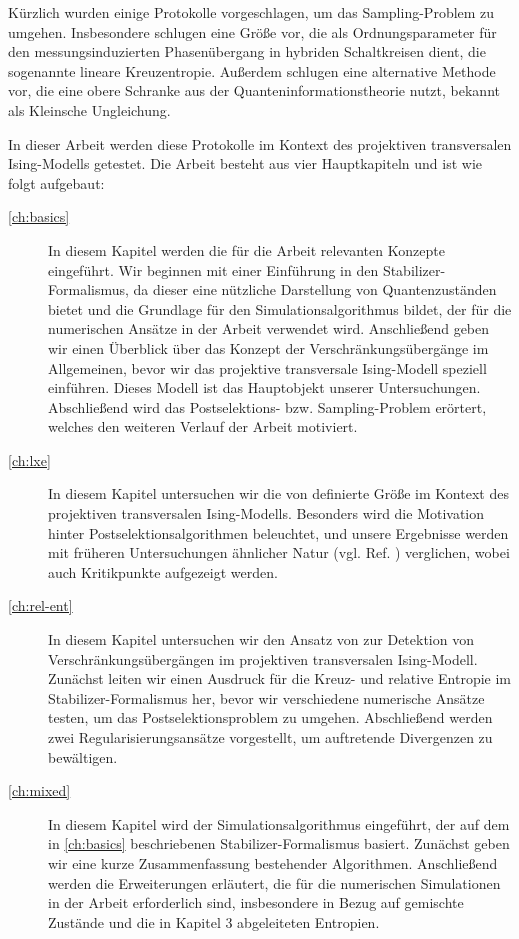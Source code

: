 Kürzlich wurden einige Protokolle vorgeschlagen, um das Sampling-Problem zu
umgehen. Insbesondere schlugen \citeauthor{liCrossEntropyBenchmark2023} eine
Größe vor, die als Ordnungsparameter für den messungsinduzierten Phasenübergang
in hybriden Schaltkreisen dient, die sogenannte lineare Kreuzentropie. Außerdem
schlugen \citeauthor{garrattProbingPostmeasurementEntanglement2023} eine
alternative Methode vor, die eine obere Schranke aus der
Quanteninformationstheorie nutzt, bekannt als Kleinsche Ungleichung.

In dieser Arbeit werden diese Protokolle im Kontext des projektiven
transversalen Ising-Modells getestet. Die Arbeit besteht aus vier Hauptkapiteln
und ist wie folgt aufgebaut:
\begin{description}
\item[\cref{ch:basics}] In diesem Kapitel werden die für die Arbeit relevanten
  Konzepte eingeführt. Wir beginnen mit einer Einführung in den
  Stabilizer-Formalismus, da dieser eine nützliche Darstellung von
  Quantenzuständen bietet und die Grundlage für den Simulationsalgorithmus
  bildet, der für die numerischen Ansätze in der Arbeit verwendet wird.
  Anschließend geben wir einen Überblick über das Konzept der
  Verschränkungsübergänge im Allgemeinen, bevor wir das projektive transversale
  Ising-Modell speziell einführen. Dieses Modell ist das Hauptobjekt unserer
  Untersuchungen. Abschließend wird das Postselektions- bzw. Sampling-Problem
  erörtert, welches den weiteren Verlauf der Arbeit motiviert.
\item[\cref{ch:lxe}] In diesem Kapitel untersuchen wir die von
  \citeauthor{liCrossEntropyBenchmark2023} definierte Größe im Kontext des
  projektiven transversalen Ising-Modells. Besonders wird die Motivation hinter
  Postselektionsalgorithmen beleuchtet, und unsere Ergebnisse werden mit
  früheren Untersuchungen ähnlicher Natur (vgl. Ref.
  \cite{tikhanovskayaUniversalityCrossEntropy2023}) verglichen, wobei auch
  Kritikpunkte aufgezeigt werden.
\item[\cref{ch:rel-ent}] In diesem Kapitel untersuchen wir den Ansatz von
  \citeauthor{garrattProbingPostmeasurementEntanglement2023} zur Detektion von
  Verschränkungsübergängen im projektiven transversalen Ising-Modell. Zunächst
  leiten wir einen Ausdruck für die Kreuz- und relative Entropie im
  Stabilizer-Formalismus her, bevor wir verschiedene numerische Ansätze testen,
  um das Postselektionsproblem zu umgehen. Abschließend werden zwei
  Regularisierungsansätze vorgestellt, um auftretende Divergenzen zu
  bewältigen.
\item[\cref{ch:mixed}] In diesem Kapitel wird der Simulationsalgorithmus
  eingeführt, der auf dem in \cref{ch:basics} beschriebenen
  Stabilizer-Formalismus basiert. Zunächst geben wir eine kurze Zusammenfassung
  bestehender Algorithmen. Anschließend werden die Erweiterungen erläutert, die
  für die numerischen Simulationen in der Arbeit erforderlich sind,
  insbesondere in Bezug auf gemischte Zustände und die in Kapitel 3
  abgeleiteten Entropien.
\end{description}

